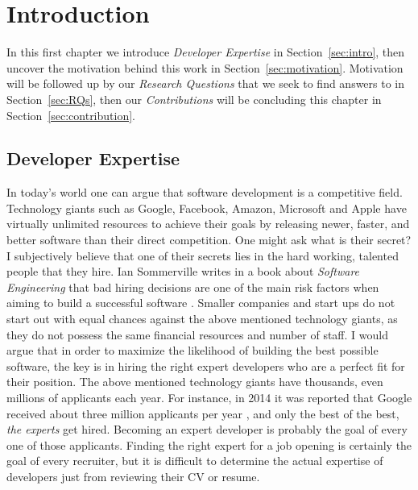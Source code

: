 \chapter{Introduction}

    In this first chapter we introduce \emph{Developer Expertise} in Section~\ref{sec:intro}, then uncover the motivation behind this work in Section~\ref{sec:motivation}. Motivation will be followed up by our \emph{Research Questions} that we seek to find answers to in Section~\ref{sec:RQs}, then our \emph{Contributions} will be concluding this chapter in Section~\ref{sec:contribution}.
    
    \section{Developer Expertise\label{sec:intro}}
    
        In today's world one can argue that software development is a competitive field. Technology giants such as Google, Facebook, Amazon, Microsoft and Apple have virtually unlimited resources to achieve their goals by releasing newer, faster, and better software than their direct competition. One might ask what is their secret? I subjectively believe that one of their secrets lies in the hard working, talented people that they hire. Ian Sommerville writes in a book about \emph{Software Engineering} that bad hiring decisions are one of the main risk factors when aiming to build a successful software \cite{sommerville2016software}. Smaller companies and start ups do not start out with equal chances against the above mentioned technology giants, as they do not possess the same financial resources and number of staff. I would argue that in order to maximize the likelihood of building the best possible software, the key is in hiring the right expert developers who are a perfect fit for their position. The above mentioned technology giants have thousands, even millions of applicants each year. For instance, in 2014 it was reported that Google received about three million applicants per year \cite{nisen_2014}, and only the best of the best, \emph{the experts} get hired. Becoming an expert developer is probably the goal of every one of those applicants. Finding the right expert for a job opening is certainly the goal of every recruiter, but it is difficult to determine the actual expertise of developers just from reviewing their CV or resume.
    
